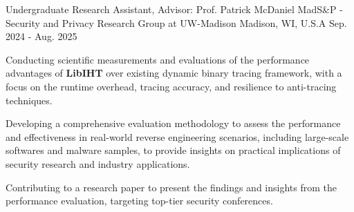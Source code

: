 

\begin{cventries}

  \cventry
    {Undergraduate Research Assistant, Advisor: Prof. Patrick McDaniel} %
    {MadS\&P - Security and Privacy Research Group at UW-Madison} %
    {Madison, WI, U.S.A} %
    {Sep. 2024 - Aug. 2025} %
    {
      \begin{cvitems} %
        \item {Conducting scientific measurements and evaluations of the performance advantages of \textbf{LibIHT} over existing dynamic binary tracing framework, with a focus on the runtime overhead, tracing accuracy, and resilience to anti-tracing techniques.}
        \item {Developing a comprehensive evaluation methodology to assess the performance and effectiveness in real-world reverse engineering scenarios, including large-scale softwares and malware samples, to provide insights on practical implications of security research and industry applications.}
        \item {Contributing to a research paper to present the findings and insights from the performance evaluation, targeting top-tier security conferences.}
      \end{cvitems}
    }


\end{cventries}
